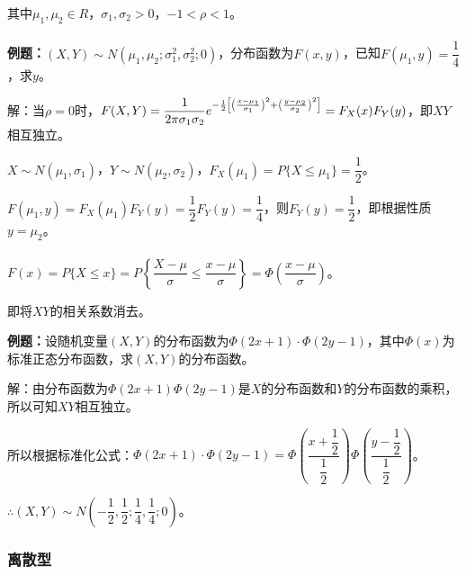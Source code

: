 其中$\mu_1,\mu_2\in R$，$\sigma_1,\sigma_2>0$，$-1<\rho<1$。

\paragraph{} \leavevmode \medskip

\textbf{例题：}$(X,Y)\sim N(\mu_1,\mu_2;\sigma_1^2,\sigma_2^2;0)$，分布函数为$F(x,y)$，已知$F(\mu_1,y)=\dfrac{1}{4}$，求$y$。

解：当$\rho=0$时，$F(X,Y)=\dfrac{1}{2\pi\sigma_1\sigma_2}e^{-\frac{1}{2}\left[\left(\frac{x-\mu_1}{\sigma_1}\right)^2+\left(\frac{y-\mu_2}{\sigma_2}\right)^2\right]}\\=F_X(x)F_Y(y)$，即$XY$相互独立。

$X\sim N(\mu_1,\sigma_1)$，$Y\sim N(\mu_2,\sigma_2)$，$F_X(\mu_1)=P\{X\leqslant\mu_1\}=\dfrac{1}{2}$。

$F(\mu_1,y)=F_X(\mu_1)F_Y(y)=\dfrac{1}{2}F_Y(y)=\dfrac{1}{4}$，则$F_Y(y)=\dfrac{1}{2}$，即根据性质$y=\mu_2$。

\paragraph{} \leavevmode \medskip

$F(x)=P\{X\leqslant x\}=P\left\{\dfrac{X-\mu}{\sigma}\leqslant\dfrac{x-\mu}{\sigma}\right\}=\varPhi\left(\dfrac{x-\mu}{\sigma}\right)$。

即将$XY$的相关系数消去。

\textbf{例题：}设随机变量$(X,Y)$的分布函数为$\varPhi(2x+1)\cdot\varPhi(2y-1)$，其中$\varPhi(x)$为标准正态分布函数，求$(X,Y)$的分布函数。

解：由分布函数为$\varPhi(2x+1)\varPhi(2y-1)$是$X$的分布函数和$Y$的分布函数的乘积，所以可知$XY$相互独立。

所以根据标准化公式：$\varPhi(2x+1)\cdot\varPhi(2y-1)=\varPhi\left(\dfrac{x+\dfrac{1}{2}}{\dfrac{1}{2}}\right)\varPhi\left(\dfrac{y-\dfrac{1}{2}}{\dfrac{1}{2}}\right)$。

$\therefore(X,Y)\sim N\left(-\dfrac{1}{2},\dfrac{1}{2};\dfrac{1}{4},\dfrac{1}{4};0\right)$。

\paragraph{}

\subsubsection{离散型}

